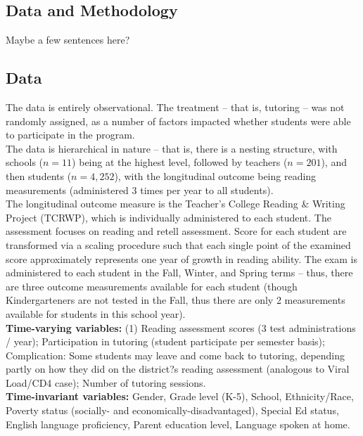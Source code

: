 \documentclass[a0,landscape]{a0poster}
\begin{document}
\begin{multicols}{3}
\color{NavyBlue}
\section*{Data and Methodology}

Maybe a few sentences here?


\subsection*{Data}

The data is entirely observational. The treatment -- that is, tutoring -- was not randomly assigned, as a number of factors impacted whether students were able to participate in the program. \\

The data is hierarchical in nature -- that is, there is a nesting structure, with schools ($n=11$) being at the highest level, followed by teachers ($n=201$), and then students ($n=4,252$), with the longitudinal outcome being reading measurements (administered 3 times per year to all students). \\

The longitudinal outcome measure is the Teacher's College Reading \& Writing Project (TCRWP), which is individually administered to each student. The assessment focuses on reading and retell assessment. Score for each student are transformed via a scaling procedure such that each single point of the examined score approximately represents one year of growth in reading ability. The exam is administered to each student in the Fall, Winter, and Spring terms -- thus, there are three outcome measurements available for each student (though Kindergarteners are not tested in the Fall, thus there are only 2 measurements available for students in this school year). \\

\textbf{Time-varying variables:} (1) Reading assessment scores (3 test administrations / year); Participation in tutoring (student participate per semester basis); Complication: Some students may leave and come back to tutoring, depending partly on how they did on the district?s reading assessment (analogous to Viral Load/CD4 case); Number of tutoring sessions. \\

\textbf{Time-invariant variables:} Gender, Grade level (K-5), School, Ethnicity/Race, Poverty status (socially- and economically-disadvantaged), Special Ed status, English language proficiency, Parent education level, Language spoken at home.


\end{multicols}
\end{document}
